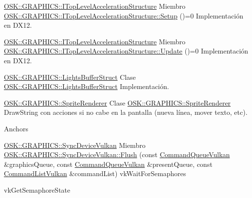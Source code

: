 \mbox{\hyperlink{class_o_s_k_1_1_g_r_a_p_h_i_c_s_1_1_i_top_level_acceleration_structure}{OSK\+::\+GRAPHICS\+::\+ITop\+Level\+Acceleration\+Structure}} Miembro \mbox{\hyperlink{class_o_s_k_1_1_g_r_a_p_h_i_c_s_1_1_i_top_level_acceleration_structure_a38a3541235fbb79778dd9513e78f070d}{OSK\+::GRAPHICS\+::ITop\+Level\+Acceleration\+Structure\+::Setup}} ()=0 \label{todo__todo000015}%
%
Implementación en DX12.  

\mbox{\hyperlink{class_o_s_k_1_1_g_r_a_p_h_i_c_s_1_1_i_top_level_acceleration_structure}{OSK\+::\+GRAPHICS\+::\+ITop\+Level\+Acceleration\+Structure}} Miembro \mbox{\hyperlink{class_o_s_k_1_1_g_r_a_p_h_i_c_s_1_1_i_top_level_acceleration_structure_ad7223ca05f358dd3aa82d53cf20f6dfa}{OSK\+::GRAPHICS\+::ITop\+Level\+Acceleration\+Structure\+::Update}} ()=0 \label{todo__todo000016}%
%
Implementación en DX12.  

\mbox{\hyperlink{struct_o_s_k_1_1_g_r_a_p_h_i_c_s_1_1_lights_buffer_struct}{OSK\+::\+GRAPHICS\+::\+Lights\+Buffer\+Struct}} Clase \mbox{\hyperlink{struct_o_s_k_1_1_g_r_a_p_h_i_c_s_1_1_lights_buffer_struct}{OSK\+::GRAPHICS\+::Lights\+Buffer\+Struct}}  \label{todo__todo000017}%
%
Implementación.  

\mbox{\hyperlink{class_o_s_k_1_1_g_r_a_p_h_i_c_s_1_1_sprite_renderer}{OSK\+::\+GRAPHICS\+::\+Sprite\+Renderer}} Clase \mbox{\hyperlink{class_o_s_k_1_1_g_r_a_p_h_i_c_s_1_1_sprite_renderer}{OSK\+::GRAPHICS\+::Sprite\+Renderer}}  \label{todo__todo000018}%
%
Draw\+String con acciones si no cabe en la pantalla (nueva línea, mover texto, etc). 

Anchors  

\mbox{\hyperlink{class_o_s_k_1_1_g_r_a_p_h_i_c_s_1_1_sync_device_vulkan}{OSK\+::\+GRAPHICS\+::\+Sync\+Device\+Vulkan}} Miembro \mbox{\hyperlink{class_o_s_k_1_1_g_r_a_p_h_i_c_s_1_1_sync_device_vulkan_a372f1f09902e5735edb66cf7ed4c1a84}{OSK\+::GRAPHICS\+::Sync\+Device\+Vulkan\+::Flush}} (const \mbox{\hyperlink{class_o_s_k_1_1_g_r_a_p_h_i_c_s_1_1_command_queue_vulkan}{Command\+Queue\+Vulkan}} \&graphics\+Queue, const \mbox{\hyperlink{class_o_s_k_1_1_g_r_a_p_h_i_c_s_1_1_command_queue_vulkan}{Command\+Queue\+Vulkan}} \&present\+Queue, const \mbox{\hyperlink{class_o_s_k_1_1_g_r_a_p_h_i_c_s_1_1_command_list_vulkan}{Command\+List\+Vulkan}} \&command\+List) \label{todo__todo000019}%
%
vk\+Wait\+For\+Semaphores 

\label{todo__todo000020}%
%
vk\+Get\+Semaphore\+State 